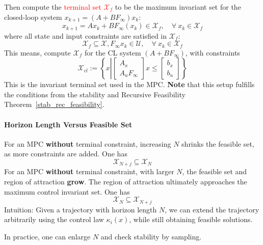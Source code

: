 Then compute the \textcolor{red}{terminal set $\mathcal{X}_f$} to be the maximum invariant set for the closed-loop system $x_{k+1} = (A+BF_\infty)x_k$:
\begin{equation*}
    x_{k+1} = Ax_k + BF_\infty(x_k) \in \mathcal{X}_f, \quad \forall \: x_k \in \mathcal{X}_f
\end{equation*}
where all state and input constraints are satisfied in $\mathcal{X}_f$:
\begin{equation*}
    \mathcal{X}_f \subseteq \mathcal{X}, F_\infty x_k \in \mathcal{U}, \quad \forall \: x_k \in \mathcal{X}_f
\end{equation*}
This means, compute $\mathcal{X}_f$ for the CL system $(A+BF_{\infty})$, with constraints
\begin{equation*}
    \mathcal{X}_{cl} := \left\{x \left|
    \begin{bmatrix}
        A_x \\ A_u F_\infty
    \end{bmatrix}
    x \leq
    \begin{bmatrix}
        b_x \\
        b_u
    \end{bmatrix}\right.\right\}
\end{equation*}
This is the invariant terminal set used in the MPC.
\newpar{}
\textbf{Note} that this setup fulfills the conditions from the stability and Recursive Feasibility Theorem~\ref{stab_rec_feasibility}.

\paragraph{Horizon Length Versus Feasible Set}

For an MPC \textbf{without} terminal constraint, increasing $N$ shrinks the feasible set, as more constraints are added. One has
\begin{equation*}
    \mathcal{X}_{N+j} \subseteq \mathcal{X}_N
\end{equation*}
\newpar{}
For an MPC \textbf{without} terminal constraint, with larger $N$, the feasible set and region of attraction \textbf{grow}. The region of attraction ultimately approaches the maximum control invariant set. One has
\begin{equation*}
    \mathcal{X}_{N} \subseteq \mathcal{X}_{N+j}
\end{equation*}
Intuition: Given a trajectory with horizon length $N$, we can extend the trajectory arbitrarily using the control law $\kappa_i(x)$, while still obtaining feasible solutions.

\newpar{}

In practice, one can enlarge $N$ and check stability by sampling.   %
